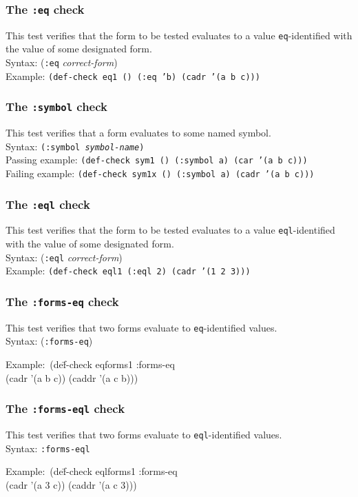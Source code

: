 \documentclass{article}
\begin{document}
\subsubsection{The \texttt{:eq} check} 
This test verifies that the form to be tested evaluates to a value
\texttt{eq}-identified with the value of some designated
form.
\\ Syntax: (\texttt{:eq} \textit{correct-form})
\\ Example: \texttt{(def-check eq1 () (:eq 'b) (cadr '(a b c)))}

\subsubsection{The \texttt{:symbol} check} 
This test verifies that a form evaluates to some named
symbol.
\\ Syntax: \texttt{(:symbol \emph{symbol-name})}
\\ Passing example: \texttt{(def-check sym1  () (:symbol a) (car '(a b c)))}
\\ Failing example: \texttt{(def-check sym1x () (:symbol a) (cadr '(a b c)))}

\subsubsection{The \texttt{:eql} check} 
This test verifies that the form to be tested evaluates to a value
\texttt{eql}-identified with the value of some designated
form.
\\ Syntax: (\texttt{:eql} \textit{correct-form})
\\ Example: \texttt{(def-check eql1 (:eql 2) (cadr '(1 2 3)))}

\subsubsection{The \texttt{:forms-eq} check} 
This test verifies that two forms evaluate to \texttt{eq}-identified
values.
\\ Syntax: (\texttt{:forms-eq})
{\ttfamily\begin{tabbing}
\textrm{Example:}\ (de\=f-check eqforms1 :forms-eq
\\ \>  (cadr '(a b c)) (caddr '(a c b)))
\end{tabbing}}

\subsubsection{The \texttt{:forms-eql} check} 
This test verifies that two forms evaluate to \texttt{eql}-identified
values.
\\ Syntax: \texttt{:forms-eql}
{\ttfamily\begin{tabbing}
\textrm{Example:}\ (de\=f-check eqlforms1 :forms-eq
\\ \>  (cadr '(a 3 c)) (caddr '(a c 3)))
\end{tabbing}}
\end{document}
